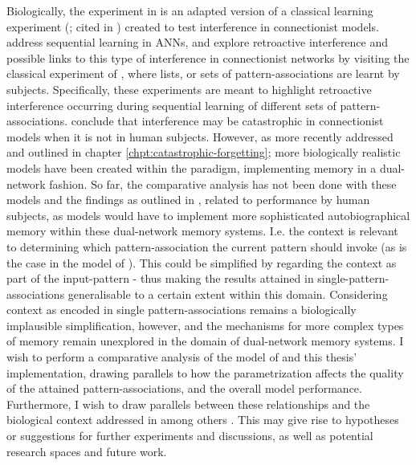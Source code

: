 Biologically, the experiment in \citep{Hattori2014, Hattori2010} is an adapted version of a classical learning experiment (\cite{Barnes1959}; cited in \cite{McCloskey1989}) created to test interference in connectionist models. \cite{McCloskey1989} address sequential learning in ANNs, and explore retroactive interference and possible links to this type of interference in connectionist networks by visiting the classical experiment of \citep{Barnes1959}, where lists, or sets of pattern-associations are learnt by subjects. Specifically, these experiments are meant to highlight retroactive interference occurring during sequential learning of different sets of pattern-associations. \cite{McCloskey1989} conclude that interference may be catastrophic in connectionist models when it is not in human subjects. However, as more recently addressed and outlined in chapter \ref{chpt:catastrophic-forgetting}; more biologically realistic models have been created within the paradigm, implementing memory in a dual-network fashion. So far, the comparative analysis has not been done with these models and the findings as outlined in \citep{McCloskey1989}, related to performance by human subjects, as models would have to implement more sophisticated autobiographical memory within these dual-network memory systems. I.e. the context is relevant to determining which pattern-association the current pattern should invoke (as is the case in the model of \cite{Hattori2014}). This could be simplified by regarding the context as part of the input-pattern - thus making the results attained in single-pattern-associations generalisable to a certain extent within this domain. Considering context as encoded in single pattern-associations remains a biologically implausible simplification, however, and the mechanisms for more complex types of memory remain unexplored in the domain of dual-network memory systems. I wish to perform a comparative analysis of the model of \cite{Hattori2014} and this thesis' implementation, drawing parallels to how the parametrization affects the quality of the attained pattern-associations, and the overall model performance. Furthermore, I wish to draw parallels between these relationships and the biological context addressed in among others \citep{McCloskey1989, Barnes1959}. This may give rise to hypotheses or suggestions for further experiments and discussions, as well as potential research spaces and future work.



